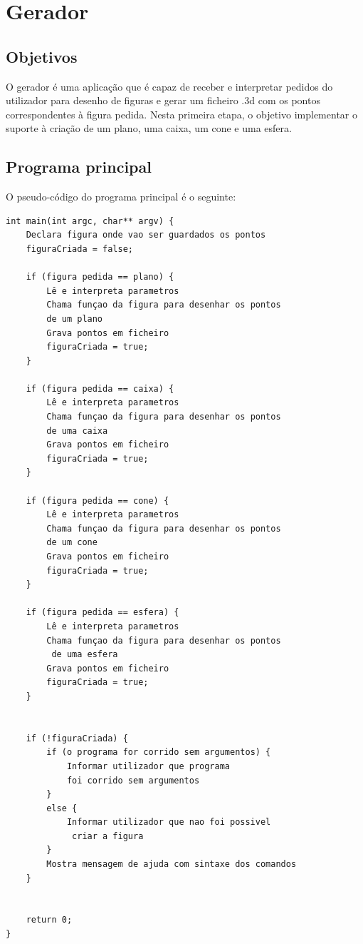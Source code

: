 \chapter{Gerador}
\label{cap:p3}

\section{Objetivos}

O gerador é uma aplicação que é capaz de receber e interpretar pedidos do utilizador para desenho de figuras e gerar um ficheiro .3d com os pontos correspondentes à figura pedida.
Nesta primeira etapa, o objetivo implementar o suporte à criação de um plano, uma caixa, um cone e uma esfera.

\section{Programa principal}

O pseudo-código do programa principal é o seguinte:


\begin{Verbatim}
int main(int argc, char** argv) {
	Declara figura onde vao ser guardados os pontos
	figuraCriada = false;
	
	if (figura pedida == plano) {
		Lê e interpreta parametros
		Chama funçao da figura para desenhar os pontos 
		de um plano
		Grava pontos em ficheiro
		figuraCriada = true;
	}
	
	if (figura pedida == caixa) {
		Lê e interpreta parametros
		Chama funçao da figura para desenhar os pontos
		de uma caixa
		Grava pontos em ficheiro
		figuraCriada = true;
	}
		
	if (figura pedida == cone) {
		Lê e interpreta parametros
		Chama funçao da figura para desenhar os pontos 
		de um cone
		Grava pontos em ficheiro
		figuraCriada = true;
	}

	if (figura pedida == esfera) {
		Lê e interpreta parametros
		Chama funçao da figura para desenhar os pontos
		 de uma esfera
		Grava pontos em ficheiro
		figuraCriada = true;
	}
	
	
	if (!figuraCriada) {
		if (o programa for corrido sem argumentos) {
			Informar utilizador que programa 
			foi corrido sem argumentos
		}
		else {
			Informar utilizador que nao foi possivel
			 criar a figura
		}
		Mostra mensagem de ajuda com sintaxe dos comandos
	}
	
	
	return 0;
}

\end{Verbatim}

